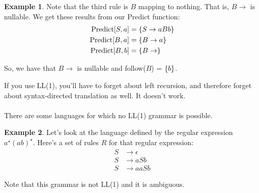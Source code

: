 \documentclass[]{article}
\DeclarePairedDelimiter{\set}{\lbrace}{\rbrace}
\theoremstyle{definition}
\newtheorem{ex}{Example}[section]
\begin{document}
\begin{ex}
					Note that the third rule is $B$ mapping to nothing. That is, $B \to$ is nullable. We get these results from our Predict function:
					\begin{align*}
						\text{Predict}[S, a] &= \set{S \to aBb} \\
						\text{Predict}[B, a] &= \set{B \to a} \\
						\text{Predict}[B, b] &= \set{B \to}
					\end{align*}

					So, we have that $B \to $ is nullable and follow($B$) = $\set{b}$.
				\end{ex}

				If you use LL(1), you'll have to forget about left recursion, and therefore forget about syntax-directed translation as well. It doesn't work.
				\\ \\
				There are some languages for which no LL(1) grammar is possible.
				\begin{ex}
					Let's look at the language defined by the regular expression $a^\star(ab)^\star$. Here's a set of rules $R$ for that regular expression:
					\begin{align*}
						S &\to \epsilon \\
						S &\to aSb \\
						S &\to aaSb
					\end{align*}

					Note that this grammar is not LL(1) and it is ambiguous.
				\end{ex}
\end{document}
